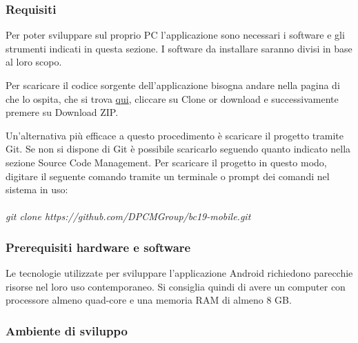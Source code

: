 \subsubsection{Requisiti}
Per poter sviluppare sul proprio PC l'applicazione sono necessari i software e gli strumenti indicati in questa sezione. I software da installare saranno divisi in base al loro scopo.

Per scaricare il codice sorgente dell'applicazione bisogna andare nella pagina di  che lo ospita, che si trova \href{https://github.com/DPCMGroup/bc19-mobile}{qui}, cliccare su Clone or download e successivamente premere su Download ZIP.

Un'alternativa più efficace a questo procedimento è scaricare il progetto tramite Git. Se non si dispone di Git è possibile scaricarlo seguendo quanto indicato nella sezione Source Code Management. Per scaricare il progetto in questo modo, digitare il seguente comando tramite un terminale o prompt dei comandi nel sistema in uso:\\ \\
\textit{git clone https://github.com/DPCMGroup/bc19-mobile.git}

\subsubsection{Prerequisiti hardware e software}
Le tecnologie utilizzate per sviluppare l'applicazione Android richiedono parecchie risorse nel loro uso contemporaneo. Si consiglia quindi di avere un computer con processore almeno quad-core e una memoria RAM di almeno 8 GB.

\subsubsection{Ambiente di sviluppo}

